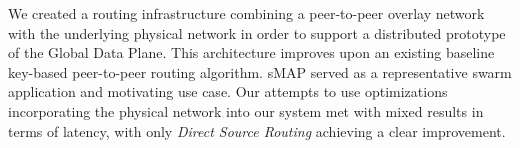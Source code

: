 We created a routing infrastructure combining a peer-to-peer overlay network with the underlying physical network in order to support a distributed prototype of the Global Data Plane. This architecture improves upon an existing baseline key-based peer-to-peer routing algorithm. sMAP served as a representative swarm application and motivating use case. Our attempts to use optimizations incorporating the physical network into our system met with mixed results in terms of latency, with only \textit{Direct Source Routing} achieving a clear improvement.
